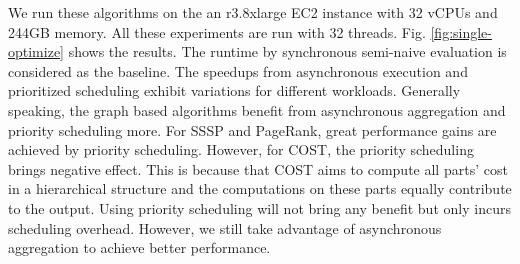 We run these algorithms on the an r3.8xlarge EC2 instance with 32 vCPUs and 244GB memory. All these experiments are run with 32 threads. Fig. \ref{fig:single-optimize} shows the results. The runtime by synchronous semi-naive evaluation is considered as the baseline. The speedups from asynchronous execution and prioritized scheduling exhibit variations for different workloads. Generally speaking, the graph based algorithms benefit from asynchronous aggregation and priority scheduling more. For SSSP and PageRank, great performance gains are achieved by priority scheduling. However, for COST, the priority scheduling brings negative effect. This is because that COST aims to compute all parts' cost in a hierarchical structure and the computations on these parts equally contribute to the output. Using priority scheduling will not bring any benefit but only incurs scheduling overhead. However, we still take advantage of asynchronous aggregation to achieve better performance.


